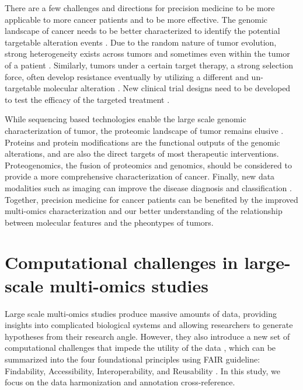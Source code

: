 There are a few challenges and directions for precision medicine to be more applicable to more cancer patients and to be more effective.
The genomic landscape of cancer needs to be better characterized to identify the potential targetable alteration events \cite{bedardpl_siull:TumourHeterogeneity2013,hymandm_baselgaj:ImplementingGenomeDriven2017,dagogo-jacki_shawat:TumourHeterogeneity2018}.
Due to the random nature of tumor evolution, strong heterogeneity exists across tumors and sometimes even within the tumor of a patient \cite{bedardpl_siull:TumourHeterogeneity2013,dagogo-jacki_shawat:TumourHeterogeneity2018}.
Similarly, tumors under a certain target therapy, a strong selection force, often develop resistance eventually by utilizing a different and un-targetable molecular alteration \cite{dagogo-jacki_shawat:TumourHeterogeneity2018}.
New clinical trial designs need to be developed to test the efficacy of the targeted treatment \cite{bedardpl_siull:TumourHeterogeneity2013}.

While sequencing based technologies enable the large scale genomic characterization of tumor, the proteomic landscape of tumor remains elusive \cite{zhangb_paulovichag:ClinicalPotential2019,rodriguezh_lowydr:NextHorizon2021}.
Proteins and protein modifications are the functional outputs of the genomic alterations, and are also the direct targets of most therapeutic interventions.
Proteogenomics, the fusion of proteomics and genomics, should be considered to provide a more comprehensive characterization of cancer.
Finally, new data modalities such as imaging can improve the disease diagnosis and classification \cite{berak_madabhushia:ArtificialIntelligence2019}.
Together, precision medicine for cancer patients can be benefited by the improved multi-omics characterization and our better understanding of the relationship between molecular features and the pheontypes of tumors.



\section{Computational challenges in large-scale multi-omics studies}
Large scale multi-omics studies produce massive amounts of data, providing insights into complicated biological systems and allowing researchers to generate hypotheses from their research angle. However, they also introduce a new set of computational challenges that impede the utility of the data \cite{marxv_marxv:DrillingBig2013,deanda-jaureguig_hernandez-lemuse:ComputationalOncology2020}, which can be summarized into the four foundational principles using FAIR guideline: Findability, Accessibility, Interoperability, and Reusability \cite{wilkinsonmd_monsb:FAIRGuiding2016}. In this study, we focus on the data harmonization and annotation cross-reference.


